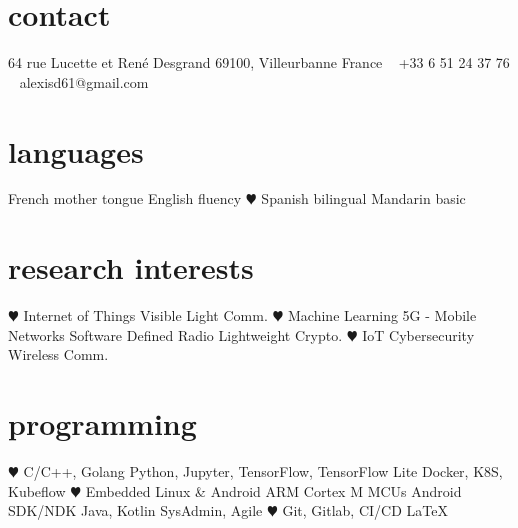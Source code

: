 \documentclass[]{cv-style}          %
\begin{document}
\lastupdated


\begin{aside}
%
\section{contact}
64 rue Lucette et René Desgrand
69100, Villeurbanne
France
~
+33 6 51 24 37 76
~
alexisd61@gmail.com
%
\section{languages}
French mother tongue
English fluency
{\color{red} $\varheartsuit$} Spanish bilingual
Mandarin basic
%
\section{research interests}
{\color{red} $\varheartsuit$} Internet of Things
Visible Light Comm.
{\color{red} $\varheartsuit$} Machine Learning
5G - Mobile Networks
Software Defined Radio
Lightweight Crypto.
{\color{red} $\varheartsuit$} IoT Cybersecurity
Wireless Comm.
%
\section{programming}
{\color{red} $\varheartsuit$} C/C++, Golang
Python, Jupyter, TensorFlow, TensorFlow Lite
Docker, K8S, Kubeflow
{\color{red} $\varheartsuit$} Embedded Linux \& Android
ARM Cortex M MCUs
Android SDK/NDK
Java, Kotlin
SysAdmin, Agile
{\color{red} $\varheartsuit$} Git, Gitlab, CI/CD
\LaTeX{}
%
\end{aside}




\end{document}
